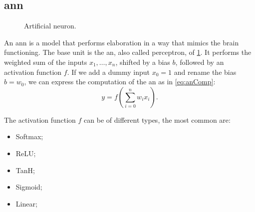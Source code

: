 \subsection{\acf{ann}}
\begin{figure}
  \centering
  \caption{Artificial neuron.}
  \label{fig:neuron}
\end{figure}
An \ac{ann} is a model that performs elaboration in a way that
mimics the brain functioning. The base unit is the \ac{an}, also called
perceptron, of
\cref{fig:neuron}. It performs the weighted sum of the inputs
$x_1,\dots,x_n$, shifted by a bias $b$, followed by an activation
function $f$. If we add a dummy input $x_0=1$ and rename the bias
$b=w_0$, we can express the computation of the \ac{an} as in
\cref{eq:anComp}:
\begin{equation}\label{eq:anComp}
  y = f(\sum_{i=0}^n w_i x_i).
\end{equation}

The activation function $f$ can be of different types, the most common are:
\begin{itemize}
\item Softmax;
\item ReLU;
\item TanH;
\item Sigmoid;
\item Linear;
\end{itemize}

